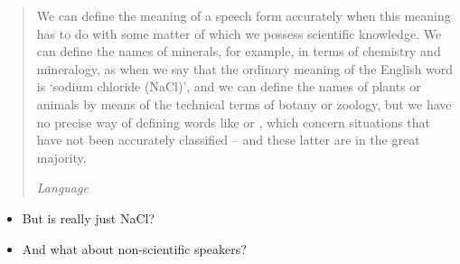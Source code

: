 \documentclass[headrule,footrule]{foils}
\begin{document}

\begin{quotation}
  We can define the meaning of a speech form accurately when this
  meaning has to do with some matter of which we possess scientific
  knowledge. We can define the names of minerals, for example, in
  terms of chemistry and mineralogy, as when we say that the ordinary
  meaning of the English word  is ‘sodium chloride (NaCl)’, and we
  can define the names of plants or animals by means of the technical
  terms of botany or zoology, but we have no precise way of defining
  words like  or , which concern situations that have not been
  accurately classified – and these latter are in the great majority.
				
\hfill				\textit{Language} \citep{Bloomfield:1933}
\end{quotation}

\begin{itemize}
\item But is  really just NaCl?
\item And what about non-scientific speakers? 
\end{itemize}
\end{document}
